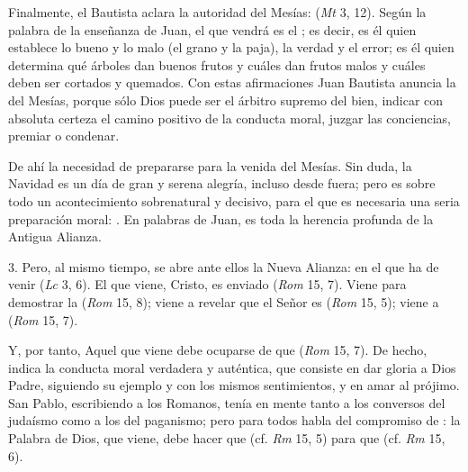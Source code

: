 \begin{body}
\begin{body}
		Finalmente, el Bautista aclara la autoridad del Mesías:  (\emph{Mt} 3, 12). Según la palabra de la enseñanza de Juan, el que vendrá es el ; es decir, es él quien establece lo bueno y lo malo (el grano y la paja), la verdad y el error; es él quien determina qué árboles dan buenos frutos y cuáles dan frutos malos y cuáles deben ser cortados y quemados. Con estas afirmaciones Juan Bautista anuncia la  del Mesías, porque sólo Dios puede ser el árbitro supremo del bien, indicar con absoluta certeza el camino positivo de la conducta moral, juzgar las conciencias, premiar o condenar.

		De ahí la necesidad de prepararse para la venida del Mesías. Sin duda, la Navidad es un día de gran y serena alegría, incluso desde fuera; pero es sobre todo un acontecimiento sobrenatural y decisivo, para el que es necesaria una seria preparación moral: . En palabras de Juan, es toda la herencia profunda de la Antigua Alianza.

		3. Pero, al mismo tiempo, se abre ante ellos la Nueva Alianza: en el que ha de venir  (\emph{Lc} 3, 6). El que viene, Cristo, es enviado  (\emph{Rom} 15, 7). Viene para demostrar la  (\emph{Rom} 15, 8); viene a revelar que el Señor es  (\emph{Rom} 15, 5); viene a  (\emph{Rom} 15, 7).

		Y, por tanto, Aquel que viene debe ocuparse de que  (\emph{Rom} 15, 7). De hecho, indica la conducta moral verdadera y auténtica, que consiste en dar gloria a Dios Padre, siguiendo su ejemplo y con los mismos sentimientos, y en amar al prójimo. San Pablo, escribiendo a los Romanos, tenía en mente tanto a los conversos del judaísmo como a los del paganismo; pero para todos habla del compromiso de : la Palabra de Dios, que viene, debe hacer que  (cf. \emph{Rm} 15, 5) para que  (cf. \emph{Rm} 15, 6).


\end{body}
\end{body}
